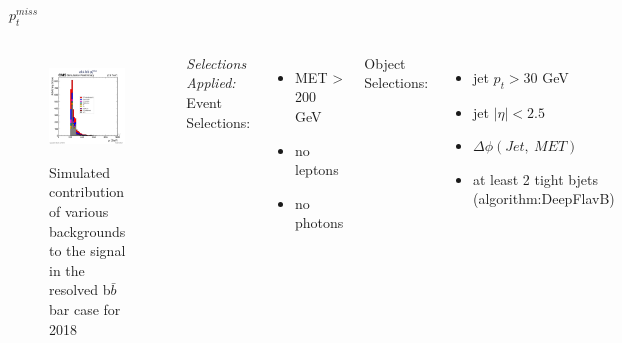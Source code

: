\documentclass[10pt,xcolor=dvipsnames]{beamer}
\begin{document}
\begin{frame}[fragile]{$p^{miss}_t$ }
  \begin{columns}
    \begin{figure}
      \centering
      \includegraphics[width=1\textwidth]{../Backgrounds/plots/SR_Resolved_Backgrounds_met_pt_hist_Combined.png}
      \label{contribution}
      \caption{Simulated contribution of various backgrounds to the signal in the resolved b$ \bar{b} $ bar case for 2018}
    \end{figure}
    \textit{Selections Applied:} \\
    Event Selections:
    \begin{itemize}
      \raggedright 
      \tiny
      \item {MET > 200 GeV}
      \item {no leptons}
      \item {no photons}
    \end{itemize}
    Object Selections:
    \begin{itemize}
      \raggedright 
      \tiny
      \item {jet $p_t > 30 $ GeV}
      \item {jet $| \eta | < 2.5 $}
      \item {$\Delta \phi (Jet, \ MET)$}
      \item {at least 2 tight bjets (algorithm:DeepFlavB)}

\end{itemize}
\end{columns}
\end{frame}
\end{document}
